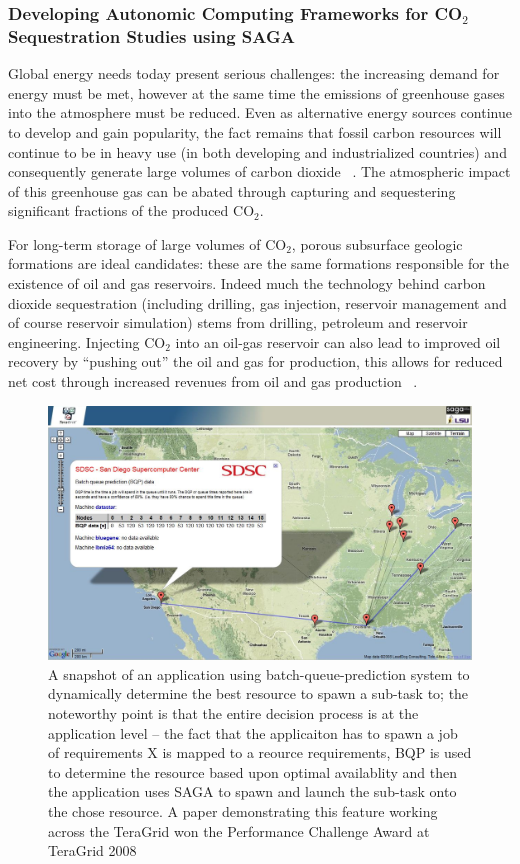 \documentclass[a4paper,10pt]{article}
\begin{document}
\subsubsection*{Developing Autonomic Computing Frameworks for CO$_2$ Sequestration Studies using SAGA}

Global energy needs today present serious challenges: the increasing demand for energy must be met, however at the same time the emissions of greenhouse gases into the atmosphere must be reduced. Even as alternative energy sources continue to develop and gain popularity, the fact remains that fossil carbon resources will continue to be in heavy use (in both developing and industrialized countries) and consequently generate large volumes of carbon dioxide ~\cite{GeoRPT}. The atmospheric impact of this greenhouse gas can be abated through capturing and sequestering significant fractions of the produced CO$_2$.

For long-term storage of large volumes of CO$_2$, porous subsurface geologic formations are ideal candidates: these are the same formations responsible for the existence of oil and gas reservoirs. Indeed much the technology behind carbon dioxide sequestration (including drilling, gas injection, reservoir management and of course reservoir simulation) stems from drilling, petroleum and reservoir engineering. Injecting CO$_2$ into an oil-gas reservoir can also lead to improved oil recovery by ``pushing out'' the oil and gas for production, this allows for reduced net cost through increased revenues from oil and gas production ~\cite{EORBook}.

\begin{figure}
\begin{center}
\includegraphics[scale=0.33]{gmaps_bqp.jpg}
\end{center}
\caption{A snapshot of an application using batch-queue-prediction system to dynamically determine the best resource to spawn a sub-task to; the noteworthy point is that the entire decision process is at the application level -- the fact that the applicaiton has to spawn a job of requirements X is mapped to a reource requirements, BQP is used to determine the resource based upon optimal availablity and then the application uses SAGA to spawn and launch the sub-task onto the chose resource. A paper demonstrating this feature working across the TeraGrid won the Performance Challenge Award at TeraGrid 2008}
\label{}
\end{figure}
\end{document}
